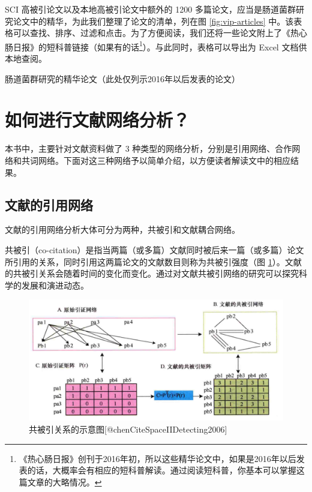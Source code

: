 \documentclass[]{ctexbook}
\begin{document}
SCI 高被引论文以及本地高被引论文中额外的 1200 多篇论文，应当是肠道菌群研究论文中的精华，为此我们整理了论文的清单，列在图 \ref{fig:vip-articles} 中。该表格可以查找、排序、过滤和点击。为了方便阅读，我们还将一些论文附上了《热心肠日报》的短科普链接（如果有的话\footnote{《热心肠日报》创刊于2016年初，所以这些精华论文中，如果是2016年以后发表的话，大概率会有相应的短科普解读。通过阅读短科普，你基本可以掌握这篇文章的大略情况。}）。与此同时，表格可以导出为 Excel 文档供本地查阅。

\hypertarget{htmlwidget-39a798cf12fdfdc6a9ae}{}

\label{fig:vip-articles}肠道菌群研究的精华论文（此处仅列示2016年以后发表的论文）

\hypertarget{network-concept}{%
\section{如何进行文献网络分析？}\label{network-concept}}

本书中，主要针对文献资料做了 3 种类型的网络分析，分别是引用网络、合作网络和共词网络。下面对这三种网络予以简单介绍，以方便读者解读文中的相应结果。

\hypertarget{ux6587ux732eux7684ux5f15ux7528ux7f51ux7edc}{%
\subsection{文献的引用网络}\label{ux6587ux732eux7684ux5f15ux7528ux7f51ux7edc}}

文献的引用网络分析大体可分为两种，共被引和文献耦合网络。

共被引（co-citation）是指当两篇（或多篇）文献同时被后来一篇（或多篇）论文所引用的关系，同时引用这两篇论文的文献数目则称为共被引强度（图 \ref{fig:co-citation-example}）。文献的共被引关系会随着时间的变化而变化。通过对文献共被引网络的研究可以探究科学的发展和演进动态。

\begin{figure}
\includegraphics[width=1\linewidth]{citespace/co-citation-example} \caption{共被引关系的示意图[@chenCiteSpaceIIDetecting2006]}\label{fig:co-citation-example}
\end{figure}
\end{document}
